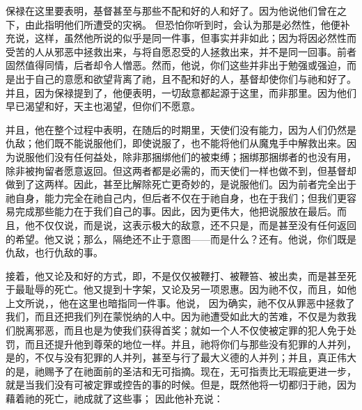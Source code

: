 \par

\par

保禄在这里要表明，基督甚至与那些不配和好的人和好了。因为他说他们曾在之下，由此指明他们所遭受的灾祸。 但恐怕你听到时，会认为那是必然性，他便补充说，这样，虽然他所说的似乎是同一件事，但事实并非如此；因为将因必然性而受苦的人从邪恶中拯救出来，与将自愿忍受的人拯救出来，并不是同一回事。前者固然值得同情，后者却令人憎恶。然而，他说，你们这些并非出于勉强或强迫，而是出于自己的意愿和欲望背离了祂，且不配和好的人，基督却使你们与祂和好了。并且，因为保禄提到了，他便表明，一切敌意都起源于这里，而非那里。因为他们早已渴望和好，天主也渴望，但你们不愿意。\par

并且，他在整个过程中表明，在随后的时期里，天使们没有能力，因为人们仍然是仇敌；他们既不能说服他们，即使说服了，也不能将他们从魔鬼手中解救出来。因为说服他们没有任何益处，除非那捆绑他们的被束缚；捆绑那捆绑者的也没有用，除非被拘留者愿意返回。但这两者都是必需的，而天使们一样也做不到，但基督却做到了这两样。因此，甚至比解除死亡更奇妙的，是说服他们。因为前者完全出于祂自身，能力完全在祂自己内，但后者不仅在于祂自身，也在于我们；但我们更容易完成那些能力在于我们自己的事。因此，因为更伟大，他把说服放在最后。而且，他不仅仅说，而是说，这表示极大的敌意，还不只是，而是甚至没有任何返回的希望。他又说；那么，隔绝还不止于意图——而是什么？还有。他说，你们既是仇敌，也行仇敌的事。\par

 接着，他又论及和好的方式，即，不是仅仅被鞭打、被鞭笞、被出卖，而是甚至死于最耻辱的死亡。他又提到十字架，又论及另一项恩惠。因为祂不仅，而且，如他上文所说，，他在这里也暗指同一件事。他说， 因为确实，祂不仅从罪恶中拯救了我们，而且还把我们列在蒙悦纳的人中。因为祂遭受如此大的苦难，不仅是为救我们脱离邪恶，而且也是为使我们获得首奖；就如一个人不仅使被定罪的犯人免于处罚，而且还提升他到尊荣的地位一样。并且，祂将你们与那些没有犯罪的人并列，是的，不仅与没有犯罪的人并列，甚至与行了最大义德的人并列；并且，真正伟大的是，祂赐予了在祂面前的圣洁和无可指摘。现在，无可指责比无瑕疵更进一步，就是当我们没有可被定罪或控告的事的时候。但是，既然他将一切都归于祂，因为藉着祂的死亡，祂成就了这些事； 因此他补充说：\par

